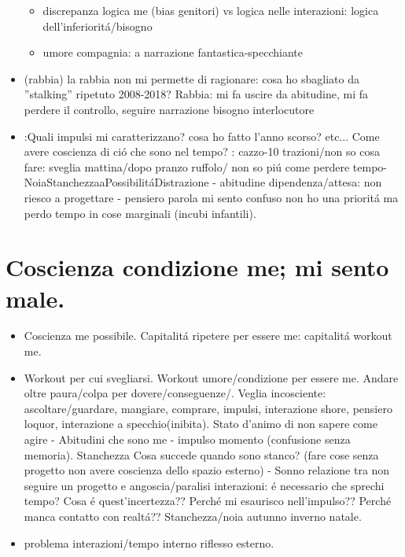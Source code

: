 \begin{itemize}
\begin{itemize}
\item discrepanza logica me (bias genitori) vs logica nelle interazioni: logica dell'inferiorit\'a/bisogno
\item umore compagnia:  a narrazione fantastica-specchiante
\end{itemize}
\item (rabbia) la rabbia non mi permette di ragionare: cosa ho sbagliato da ''stalking'' ripetuto 2008-2018?
Rabbia: mi fa uscire da abitudine, mi fa perdere il controllo, seguire narrazione bisogno interlocutore
\item {}:Quali impulsi mi caratterizzano? cosa ho fatto l'anno scorso? etc... Come avere coscienza di ci\'o che sono nel tempo?
: cazzo-10 trazioni/non so cosa fare: sveglia mattina/dopo pranzo ruffolo/ non so pi\'u come perdere tempo-NoiaStanchezzaaPossibilit\'aDistrazione - abitudine dipendenza/attesa: non riesco a progettare - pensiero parola mi sento confuso non ho una priorit\'a ma perdo tempo in cose marginali (incubi    infantili).
\end{itemize}

{\let\clearpage\relax
\chapter{Coscienza condizione me; mi sento male.}
}
\begin{itemize}
\item Coscienza me possibile. Capitalit\'a ripetere per essere me: capitalit\'a workout me.
\item {} Workout per cui svegliarsi. Workout umore/condizione per essere me.
Andare oltre paura/colpa per dovere/conseguenze/.
Veglia incosciente: ascoltare/guardare, mangiare, comprare, impulsi, interazione shore, pensiero loquor, interazione a specchio(inibita).
Stato d'animo di non sapere come agire - Abitudini che sono me - impulso momento (confusione senza memoria).
Stanchezza Cosa succede quando sono stanco? (fare cose senza progetto non avere coscienza dello spazio esterno) - Sonno relazione tra non seguire un progetto e angoscia/paralisi interazioni: \'e necessario che sprechi tempo? Cosa \'e quest'incertezza?? Perch\'e mi esaurisco nell'impulso?? Perch\'e manca contatto con realt\'a?? Stanchezza/noia autunno inverno natale.
\item problema interazioni/tempo interno riflesso esterno.
\end{itemize}

